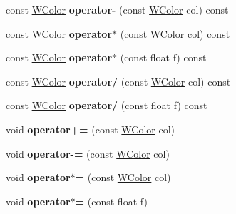 \begin{DoxyCompactItemize}
\item 
const \hyperlink{class_w_color}{W\+Color} {\bfseries operator-\/} (const \hyperlink{class_w_color}{W\+Color} col) const \hypertarget{class_w_color_a34ff188b2bf3a82cc5ea8978756ec207}{}\label{class_w_color_a34ff188b2bf3a82cc5ea8978756ec207}

\item 
const \hyperlink{class_w_color}{W\+Color} {\bfseries operator$\ast$} (const \hyperlink{class_w_color}{W\+Color} col) const \hypertarget{class_w_color_a693d15a5e4d09deefc8ef39a743cb3d0}{}\label{class_w_color_a693d15a5e4d09deefc8ef39a743cb3d0}

\item 
const \hyperlink{class_w_color}{W\+Color} {\bfseries operator$\ast$} (const float f) const \hypertarget{class_w_color_a5b61354d4d937c469a562d5492b0db12}{}\label{class_w_color_a5b61354d4d937c469a562d5492b0db12}

\item 
const \hyperlink{class_w_color}{W\+Color} {\bfseries operator/} (const \hyperlink{class_w_color}{W\+Color} col) const \hypertarget{class_w_color_a0c08f33a826df055d2e84057c887ec16}{}\label{class_w_color_a0c08f33a826df055d2e84057c887ec16}

\item 
const \hyperlink{class_w_color}{W\+Color} {\bfseries operator/} (const float f) const \hypertarget{class_w_color_ad7b46b7048d4aea9c3d195ab3833eb8a}{}\label{class_w_color_ad7b46b7048d4aea9c3d195ab3833eb8a}

\item 
void {\bfseries operator+=} (const \hyperlink{class_w_color}{W\+Color} col)\hypertarget{class_w_color_a26a45fa3192e93dfba4ea7f8f62f42a2}{}\label{class_w_color_a26a45fa3192e93dfba4ea7f8f62f42a2}

\item 
void {\bfseries operator-\/=} (const \hyperlink{class_w_color}{W\+Color} col)\hypertarget{class_w_color_a3d2337783b0a2ff94f19c51d45f6b729}{}\label{class_w_color_a3d2337783b0a2ff94f19c51d45f6b729}

\item 
void {\bfseries operator$\ast$=} (const \hyperlink{class_w_color}{W\+Color} col)\hypertarget{class_w_color_a02a2bd936d7589d6462440c901f7df28}{}\label{class_w_color_a02a2bd936d7589d6462440c901f7df28}

\item 
void {\bfseries operator$\ast$=} (const float f)\hypertarget{class_w_color_a6292148e15f11fa942542102a02cf035}{}\label{class_w_color_a6292148e15f11fa942542102a02cf035}


\end{DoxyCompactItemize}

